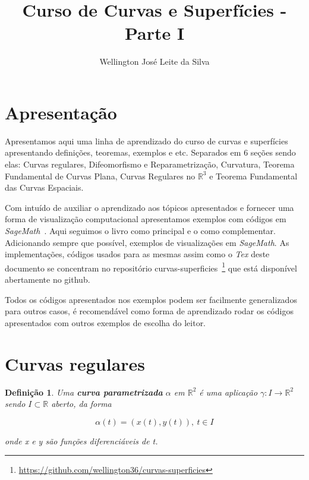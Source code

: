 \documentclass[12pt]{article}
\title{Curso de Curvas e Superfícies - Parte I}
\author{Wellington José Leite da Silva\inst{1}}
\date{}
\newtheorem{definition}{Definição}
\newcommand{\furl}[1]{\footnote{\url{#1}}}
\begin{document}
\maketitle






\section*{Apresentação}\label{s1}
Apresentamos aqui uma linha de aprendizado do curso de curvas e superfícies apresentando definições, teoremas, exemplos e etc. Separados em 6 seções sendo elas: Curvas regulares, Difeomorfismo e Reparametrização, Curvatura, Teorema Fundamental de Curvas Plana, Curvas Regulares no $\mathbb{R}^3$ e Teorema Fundamental das Curvas Espaciais. 

Com intuído de auxiliar o aprendizado aos tópicos apresentados e fornecer uma forma de visualização computacional apresentamos exemplos com códigos em \textit{SageMath}~\cite{sagemath}. Aqui seguimos o livro \cite{bookmain} como principal e o \cite{manfredo} como complementar. Adicionando sempre que possível, exemplos de visualizações em \textit{SageMath}. As implementações, códigos usados para as mesmas assim como o \textit{Tex} deste documento se concentram no repositório curvas-superficies~\furl{https://github.com/wellington36/curvas-superficies} que está disponível abertamente no github.

Todos os códigos apresentados nos exemplos podem ser facilmente generalizados para outros casos, é recomendável como forma de aprendizado rodar os códigos apresentados com outros exemplos de escolha do leitor.

\section{Curvas regulares}\label{s2}

\begin{definition}
Uma \textbf{curva parametrizada} $\alpha$ em $\mathbb{R}^2$ é uma aplicação $\gamma: I \rightarrow \mathbb{R}^2$ sendo $I \subset \mathbb{R}$ aberto, da forma

$$\alpha(t) = (x(t), y(t)),\ t\in I$$

onde x e y são funções diferenciáveis de t.
\end{definition}
\end{document}
